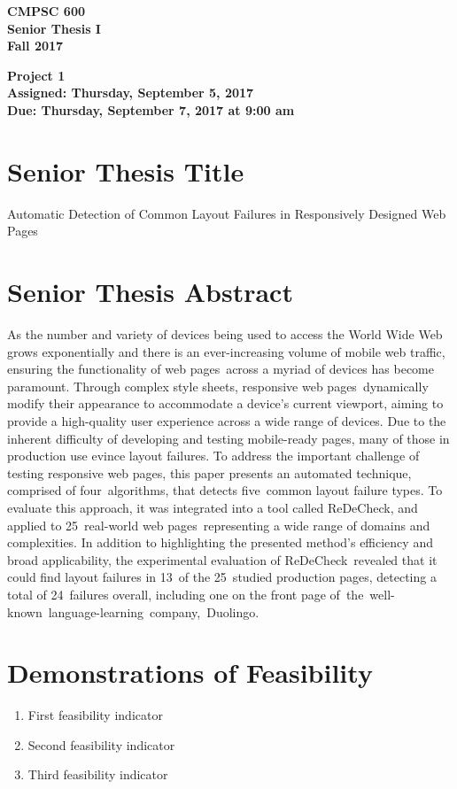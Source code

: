\documentclass[11pt]{article}
\newcommand{\assignmentduedate}{September 7}
\newcommand{\assignmentassignedate}{September 5}
\newcommand{\labyear}{2017}
\newcommand{\labday}{Thursday}
\newcommand{\labtime}{9:00 am}
\newcommand{\assigneddate}{Assigned: \labday, \assignmentassignedate, \labyear{}}
\newcommand{\duedate}{Due: \labday, \assignmentduedate, \labyear{} at \labtime{}}
\newcommand{\projecttitle}[1]
{
  \begin{center}
    \begin{center}
      \bf
      CMPSC 600\\Senior Thesis I\\
      Fall 2017\\
      \medskip
    \end{center}
    \bf
    #1
  \end{center}
}
\newcommand{\webpages}{web pages\xspace}
\newcommand{\stylesheets}{style sheets\xspace}
\newcommand{\numtypes}{five\xspace}
\newcommand{\numalgorithms}{four\xspace}
\newcommand{\numsubjects}{25\xspace}
\newcommand{\totalfailures}{24\xspace}
\newcommand{\numpageswithfailures}{13\xspace}
\newcommand{\redecheck}{{\sc ReDeCheck}\xspace}
\begin{document}
\thispagestyle{empty}

\projecttitle{Project 1 \\ \assigneddate{} \\ \duedate{}}

\section*{Senior Thesis Title}

\noindent
Automatic Detection of Common Layout Failures in Responsively Designed Web Pages

\section*{Senior Thesis Abstract}

As the number and variety of devices being used to access the World Wide Web grows exponentially and there is an
ever-increasing volume of mobile web traffic, ensuring the functionality of \webpages~across a myriad of devices has
become paramount. Through complex \stylesheets, responsive \webpages~dynamically modify their appearance to
accommodate a device's current viewport, aiming to provide a high-quality user experience across a wide range of
devices. Due to the inherent difficulty of developing and testing mobile-ready pages, many of those in production use
evince layout failures. To address the important challenge of testing responsive \webpages, this paper presents an
automated technique, comprised of \numalgorithms~algorithms, that detects \numtypes~common layout failure types. To
evaluate this approach, it was integrated into a tool called \mbox{\redecheck}, and applied to \numsubjects~real-world
\webpages~representing a wide range of domains and complexities. In addition to highlighting the presented method's
efficiency and broad applicability, the experimental evaluation of \redecheck~revealed that it could find layout
failures in \numpageswithfailures~of the \numsubjects~studied production pages, detecting a total of
\totalfailures~failures overall, including one on the front page of~\mbox{the well-known language-learning company,
Duolingo}.

\section*{Demonstrations of Feasibility}

\begin{enumerate}
  \item First feasibility indicator
  \item Second feasibility indicator
  \item Third feasibility indicator
\end{enumerate}
\end{document}

